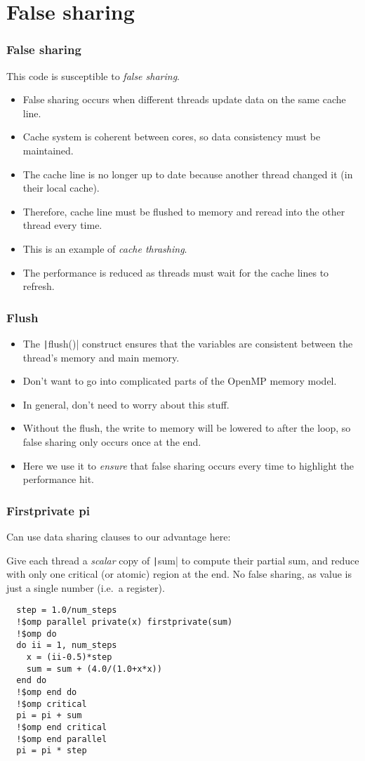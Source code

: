 \documentclass{beamer}
\begin{document}
\section{False sharing}
\begin{frame}
\frametitle{False sharing}
This code is susceptible to \emph{false sharing}.
\begin{itemize}
  \item False sharing occurs when different threads update data on the same cache line.
  \item Cache system is coherent between cores, so data consistency must be maintained.
  \item The cache line is no longer up to date because another thread changed it (in their local cache).
  \item Therefore, cache line must be flushed to memory and reread into the other thread every time.
  \item This is an example of \emph{cache thrashing}.
  \item The performance is reduced as threads must wait for the cache lines to refresh.
\end{itemize}
\end{frame}

\begin{frame}
\frametitle{Flush}
\begin{itemize}
  \item The \texttt|flush()| construct ensures that the variables are consistent between the thread's memory and main memory.
  \item Don't want to go into complicated parts of the OpenMP memory model.
  \item In general, don't need to worry about this stuff.
  \item Without the flush, the write to memory will be lowered to after the loop, so false sharing only occurs once at the end.
  \item Here we use it to \emph{ensure} that false sharing occurs every time to highlight the performance hit.
\end{itemize}
\end{frame}

\begin{frame}[fragile]
\frametitle{Firstprivate pi}
Can use data sharing clauses to our advantage here:

Give each thread a \emph{scalar} copy of \texttt|sum| to compute their partial sum, and reduce with only one critical (or atomic) region at the end.
No false sharing, as value is just a single number (i.e.\ a register).
\begin{verbatim}
  step = 1.0/num_steps
  !$omp parallel private(x) firstprivate(sum)
  !$omp do
  do ii = 1, num_steps
    x = (ii-0.5)*step
    sum = sum + (4.0/(1.0+x*x))
  end do
  !$omp end do
  !$omp critical
  pi = pi + sum
  !$omp end critical
  !$omp end parallel
  pi = pi * step
\end{verbatim}
\end{frame}
\end{document}
